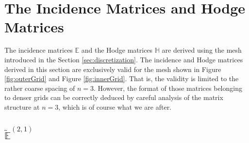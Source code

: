 \section{The Incidence Matrices and Hodge Matrices}

The incidence matrices $\mathbb{E}$ and the Hodge matrices $\mathbb{H}$ are derived using the mesh introduced in the Section \ref{sec:discretization}. The incidence and Hodge matrices derived in this section are exclusively valid for the mesh shown in Figure \ref{fig:outerGrid} and Figure \ref{fig:innerGrid}. That is, the validity is limited to the rather coarse spacing of $n = 3$. However, the format of those matrices belonging to denser grids can be correctly deduced by careful analysis of the matrix structure at $n = 3$, which is of course what we are after.

\subsection{$\tilde{\mathbb{E}}^{(2,1)}$}

